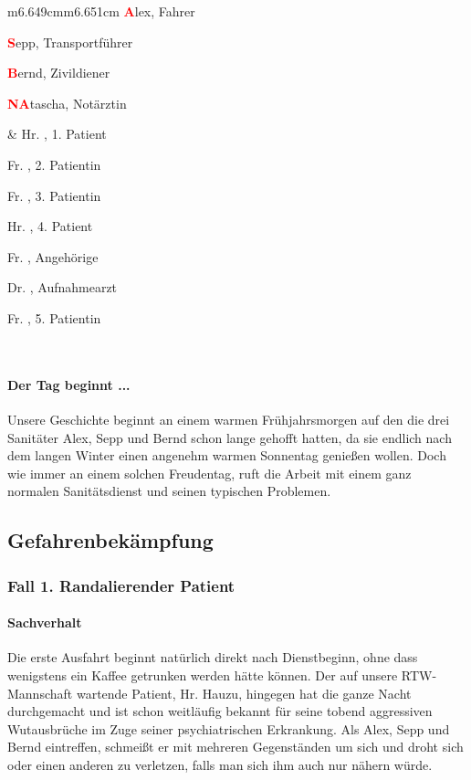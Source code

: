 \begin{center}
\tablehead{}\begin{supertabular}{m{6.649cm}m{6.651cm}}
\textbf{\textcolor{red}{A}}lex, Fahrer

\textbf{\textcolor{red}{S}}epp, Transportf\"uhrer

\textbf{\textcolor{red}{B}}ernd, Zivildiener

\textbf{\textcolor{red}{NA}}tascha, Notärztin

 &
Hr. , 1. Patient

Fr. , 2. Patientin

Fr. , 3. Patientin

Hr. , 4. Patient

Fr. , Angeh\"orige

Dr. , Aufnahmearzt

Fr. , 5. Patientin

\\
\end{supertabular}
\end{center}

\paragraph{Der Tag beginnt ...}
Unsere Geschichte beginnt an einem warmen Fr\"uhjahrs\-morgen auf den die
drei Sanitäter Alex, Sepp und Bernd schon lange gehofft hatten, da
sie endlich nach dem langen Winter einen angenehm warmen Sonnentag
genie{\ss}en wollen. Doch wie immer an einem solchen Freudentag, ruft
die Arbeit mit einem ganz normalen Sanitätsdienst und seinen
typischen Problemen.

\subsection{Gefahrenbekämpfung}

\subsubsection{Fall 1. Randalierender Patient}

\paragraph*{Sachverhalt}
Die erste Ausfahrt beginnt nat\"urlich direkt nach Dienstbeginn, ohne
dass wenigstens ein Kaffee getrunken werden hätte k\"onnen. Der auf
unsere RTW-Mann\-schaft wartende Patient, Hr. Hauzu, hingegen hat die
ganze Nacht durchgemacht und ist schon weit\-läufig bekannt f\"ur seine
tobend aggressiven Wut\-aus\-br\"uche im Zuge seiner psychiatrischen
Erkrankung. Als Alex, Sepp und Bernd eintreffen, schmei{\ss}t er mit
mehreren Gegenständen um sich und droht sich oder einen anderen zu
verletzen, falls man sich ihm auch nur nähern w\"urde.

